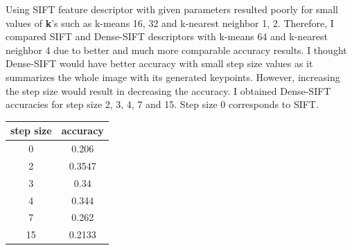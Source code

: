 \documentclass[12pt]{article}
\begin{document}
\begin{itemize}
        Using SIFT feature descriptor with given parameters resulted poorly for small values of \textbf{k}'s such as k-means 16, 32 and k-nearest neighbor 1, 2. Therefore, I compared SIFT and Dense-SIFT descriptors with k-means 64 and k-nearest neighbor 4 due to better and much more comparable accuracy results. I thought Dense-SIFT would have better accuracy with small step size values as it summarizes the whole image with its generated keypoints. However, increasing the step size would result in decreasing the accuracy. I obtained Dense-SIFT accuracies for step size 2, 3, 4, 7 and 15. Step size 0 corresponds to SIFT.
        
        \begin{minipage}{\textwidth}
			\begin{minipage}{0.49\textwidth}
				\centering
				\captionsetup{width=.9\textwidth}
			 \end{minipage}
			 \hfill
			\begin{minipage}{0.49\textwidth}
				\centering
				\begin{tabular}{ | c | c | }
				  \hline			
				  \bf step size & \bf accuracy \\
				  \hline		
				  0 & 0.206 \\
				  \hline	
				  2 & 0.3547 \\
				  \hline	
				  3 & 0.34 \\
				  \hline	
				  4 & 0.344 \\
				  \hline	
				  7 & 0.262 \\
				  \hline	
				  15 & 0.2133 \\
				  \hline
				\end{tabular}
				\captionsetup{width=.8\textwidth}
			\end{minipage}
		\end{minipage} \\
		

\end{itemize}
\end{document}
